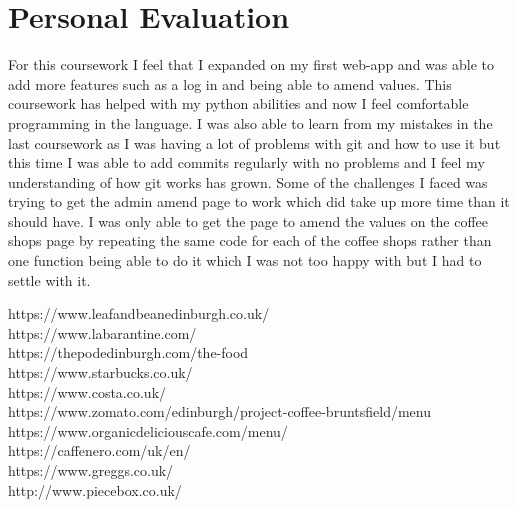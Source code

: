 \documentclass[10pt, a4paper]{article}
\begin{document}
    \section{Personal Evaluation}
        For this coursework I feel that I expanded on my first web-app and was able to add more features such as a log in and being able to amend values.  This coursework has helped with my python abilities and now I feel comfortable programming in the language.  I was also able to learn from my mistakes in the last coursework as I was having a lot of problems with git and how to use it but this time I was able to add commits regularly with no problems and I feel my understanding of how git works has grown.  Some of the challenges I faced was trying to get the admin amend page to work which did take up more time than it should have.  I was only able to get the page to amend the values on the coffee shops page by repeating the same code for each of the coffee shops rather than one function being able to do it which I was not too happy with but I had to settle with it.  
    
	    


 https://www.leafandbeanedinburgh.co.uk/\\
 https://www.labarantine.com/\\
 https://thepodedinburgh.com/the-food\\
 https://www.starbucks.co.uk/\\
 https://www.costa.co.uk/\\
 https://www.zomato.com/edinburgh/project-coffee-bruntsfield/menu\\
 https://www.organicdeliciouscafe.com/menu/\\
 https://caffenero.com/uk/en/\\
 https://www.greggs.co.uk/\\
 http://www.piecebox.co.uk/\\
\end{document}
